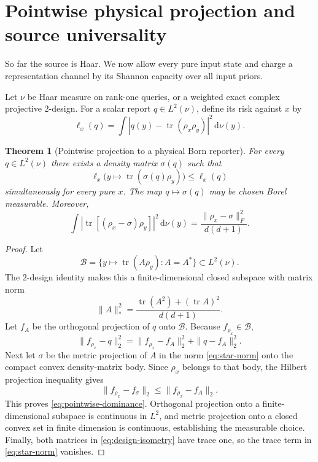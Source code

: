 \documentclass[11pt,a4paper]{article}
\newtheorem{theorem}{Theorem}[section]
\theoremstyle{remark}
\newcommand{\Tr}{\operatorname{tr}}
\newcommand{\dd}{\,\mathrm{d}}
\begin{document}
\section{Pointwise physical projection and source universality}

So far the source is Haar.  We now allow every pure input state and charge a
representation channel by its Shannon capacity over all input priors.

Let $\nu$ be Haar measure on rank-one queries, or a weighted exact complex
projective $2$-design.  For a scalar report $q\in L^2(\nu)$, define its risk
against $x$ by
\begin{equation}
 \ell_x(q)=\int |q(y)-\Tr(\rho_x\rho_y)|^2\dd\nu(y).
 \label{eq:pointwise-risk}
\end{equation}

\begin{theorem}[Pointwise projection to a physical Born reporter]
\label{thm:pointwise-projection}
For every $q\in L^2(\nu)$ there exists a density matrix $\sigma(q)$ such that
\begin{equation}
 \ell_x\bigl(y\mapsto\Tr(\sigma(q)\rho_y)\bigr)
 \le\ell_x(q)
 \label{eq:pointwise-dominance}
\end{equation}
simultaneously for every pure $x$.  The map $q\mapsto\sigma(q)$ may be chosen
Borel measurable.  Moreover,
\begin{equation}
 \int|\Tr[(\rho_x-\sigma)\rho_y]|^2\dd\nu(y)
 =\frac{\|\rho_x-\sigma\|_F^2}{d(d+1)}.
 \label{eq:design-isometry}
\end{equation}
\end{theorem}

\begin{proof}
Let
\begin{equation}
 \mathcal B=\{y\mapsto\Tr(A\rho_y):A=A^*\}
 \subset L^2(\nu).
\end{equation}
The $2$-design identity makes this a finite-dimensional closed subspace with
matrix norm
\begin{equation}
 \|A\|_*^2=
 \frac{\Tr(A^2)+(\Tr A)^2}{d(d+1)}.
 \label{eq:star-norm}
\end{equation}
Let $f_A$ be the orthogonal projection of $q$ onto $\mathcal B$.  Because
$f_{\rho_x}\in\mathcal B$,
\begin{equation}
 \|f_{\rho_x}-q\|_2^2
 =\|f_{\rho_x}-f_A\|_2^2+\|q-f_A\|_2^2.
\end{equation}
Next let $\sigma$ be the metric projection of $A$ in the norm
\eqref{eq:star-norm} onto the compact convex density-matrix body.  Since
$\rho_x$ belongs to that body, the Hilbert projection inequality gives
\begin{equation}
 \|f_{\rho_x}-f_\sigma\|_2
 \le\|f_{\rho_x}-f_A\|_2.
\end{equation}
This proves \eqref{eq:pointwise-dominance}.  Orthogonal projection onto a
finite-dimensional subspace is continuous in $L^2$, and metric projection
onto a closed convex set in finite dimension is continuous, establishing the
measurable choice.  Finally, both matrices in \eqref{eq:design-isometry} have
trace one, so the trace term in \eqref{eq:star-norm} vanishes.
\end{proof}
\end{document}

